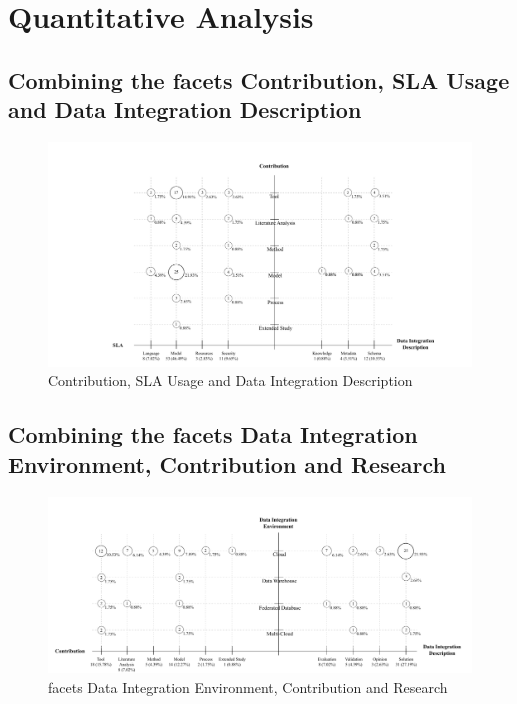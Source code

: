 \section{Quantitative Analysis}

\subsection{Combining the facets Contribution, SLA Usage and Data Integration Description}

\begin{figure}[h!]
\centering
\includegraphics[scale=0.5]{figs/bubble-charts/Contribution-SLA-DIdescription.pdf} 
\caption{Contribution, SLA Usage and Data Integration Description}\label{fig:facet1}
\end{figure}

\subsection{Combining the facets Data Integration Environment, Contribution and Research}

\begin{figure}[h!]
\centering
\includegraphics[scale=0.5]{figs/bubble-charts/DI-Environment-Contribution-Research.pdf}
\caption{facets Data Integration Environment, Contribution and Research}\label{fig:facet2}
\end{figure}

